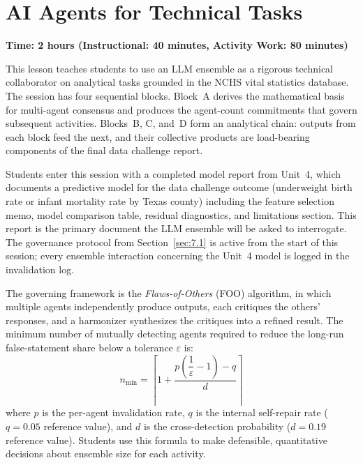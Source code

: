 \section{AI Agents for Technical Tasks}
\label{sec:7.2}

\textbf{Time: 2 hours (Instructional: 40 minutes, Activity Work:
80 minutes)}

This lesson teaches students to use an LLM ensemble as a rigorous
technical collaborator on analytical tasks grounded in the NCHS
vital statistics database. The session has four sequential blocks.
Block~A derives the mathematical basis for multi-agent consensus
and produces the agent-count commitments that govern subsequent
activities. Blocks~B, C, and~D form an analytical chain: outputs
from each block feed the next, and their collective products are
load-bearing components of the final data challenge report.

Students enter this session with a completed model report from
Unit~4, which documents a predictive model for the data
challenge outcome (underweight birth rate or infant mortality
rate by Texas county) including the feature selection memo,
model comparison table, residual diagnostics, and limitations
section. This report is the primary document the LLM ensemble
will be asked to interrogate. The governance protocol
from Section~\ref{sec:7.1} is active from the start of this
session; every ensemble interaction concerning the Unit~4
model is logged in the invalidation log.

The governing framework is the \emph{Flaws-of-Others} (FOO)
algorithm, in which multiple agents independently produce outputs,
each critiques the others' responses, and a harmonizer synthesizes
the critiques into a refined result. The minimum number of
mutually detecting agents required to reduce the long-run
false-statement share below a tolerance $\varepsilon$ is:
%
\begin{equation}
    n_{\min} =
    \left\lceil
        1 + \frac{p\!\left(\dfrac{1}{\varepsilon} - 1\right) - q}{d}
    \right\rceil
    \label{eq:nmin}
\end{equation}
%
where $p$ is the per-agent invalidation rate, $q$ is the internal
self-repair rate ($q = 0.05$ reference value), and $d$ is the
cross-detection probability ($d = 0.19$ reference value). Students
use this formula to make defensible, quantitative decisions about
ensemble size for each activity.

